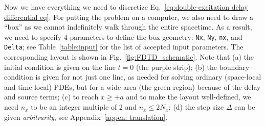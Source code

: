 \documentclass[12pt,letter,onecolumn,notitlepage]{article}
\begin{document}
Now we have everything we need to discretize Eq.~\eqref{eq:double-excitation delay differential eq}. For putting the problem on a computer, we also need to draw a ``box'' as we cannot indefinitely walk through the entire spacetime. As a result, we need to specify 4 parameters to define the box geometry: \texttt{Nx}, \texttt{Ny}, \texttt{nx}, and \texttt{Delta}; see Table~\ref{table:input} for the list of accepted input parameters.
The corresponding layout is shown in Fig.~\ref{fig:FDTD_schematic}. Note that (a) the initial condition is given on the line $t=0$ (the purple strip); (b) the boundary condition is given for not just one line, as needed for solving ordinary (space-local and time-local) PDEs, but for a wide area (the green region) because of the delay and source terms; (c) to reach $x\geq+a$ and to make the layout well-defined, we need $n_x$ to be an integer multiple of 2 and $n_x\leq2N_x$; (d) the step size $\Delta$ can be given \textit{arbitrarily}, see Appendix~\ref{appen: translation}.


\end{document}
